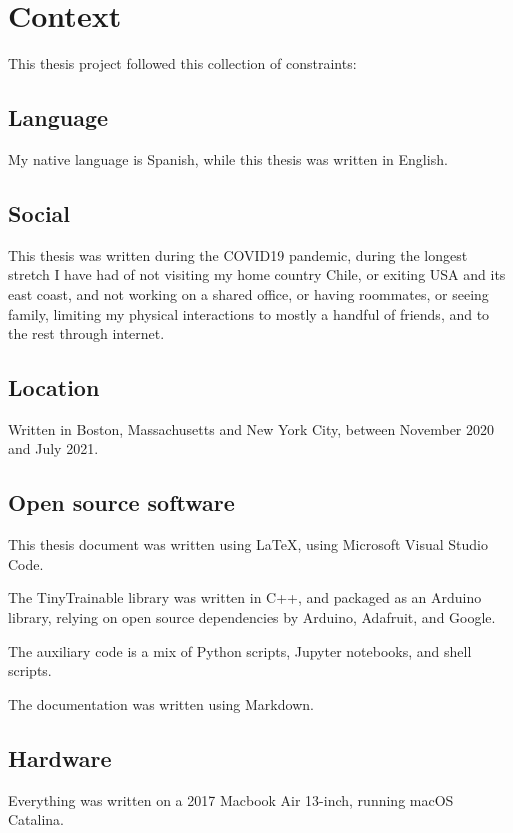 \chapter{Context}

This thesis project followed this collection of constraints:

\section{Language}

My native language is Spanish, while this thesis was written in English.

\section{Social}

This thesis was written during the COVID19 pandemic, during the longest stretch I have had of not visiting my home country Chile, or exiting USA and its east coast, and not working on a shared office, or having roommates, or seeing family, limiting my physical interactions to mostly a handful of friends, and to the rest through internet.

\section{Location}

Written in Boston, Massachusetts and New York City, between November 2020 and July 2021.

\section{Open source software}

This thesis document was written using LaTeX, using Microsoft Visual Studio Code.

The TinyTrainable library was written in C++, and packaged as an Arduino library, relying on open source dependencies by Arduino, Adafruit, and Google.

The auxiliary code is a mix of Python scripts, Jupyter notebooks, and shell scripts.

The documentation was written using Markdown.

\section{Hardware}

Everything was written on a 2017 Macbook Air 13-inch, running macOS Catalina.

\newpage
